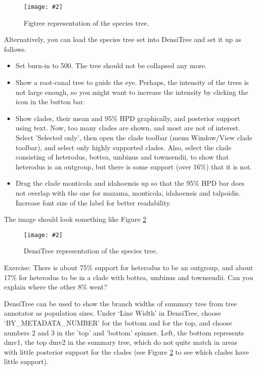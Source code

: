 \documentclass{article}
\newcommand{\includeimage}[2][]{%
\texttt{[image: \#2]}
}
\begin{document}
\begin{figure}
\centering
\includeimage[width=\textwidth]{figures/figtree}

\caption{\label{fig.figtree} Figtree representation of the species tree.}
\end{figure}


Alternatively, you can load the species tree set into DensiTree and set it up as follows.

\begin{itemize}
\item Set burn-in to 500. The tree should not be collapsed any more.
\item Show a root-canal tree to guide the eye. Perhaps, the intensity of the trees is not large enough, so you might want to increase the intensity by clicking the icon in the button bar.
\item Show clades, their mean and 95\% HPD graphically, and posterior support using text. Now, too many clades are shown, and most are not of interest. Select 'Selected only', then open the clade toolbar (menu Window/View clade toolbar), and select only highly supported clades. Also, select the clade consisting of heterodus, bottea, umbinus and townsendii, to show that heterodus is an outgroup,
but there is some support (over 16\%) that it is not.
\item Drag the clade monticola and idahoensis up so that the 95\% HPD bar does not overlap with the one for mazama, monticola, idahoensis and talpoidis. Increase font size of the label for better readability.
\end{itemize}

The image should look something like Figure \ref{fig.DensiTree}

\begin{figure}
\centering
\includeimage[scale=0.4]{figures/DensiTree}
\caption{\label{fig.DensiTree} DensiTree representation of the species tree.}
\end{figure}

Exercise: There is about 75\% support for heterodus to be an outgroup, and about 17\% for heterodus to be in a clade with bottea, umbinus and townsendii. Can you explain where the other 8\% went?


DensiTree can be used to show the branch widths of summary 
tree from tree annotator as population sizes. 
Under `Line Width' in DensiTree, choose `BY\_METADATA\_NUMBER' for the bottom and for the top,
and choose numbers 2 and 3 in the 'top' and 'bottom' spinner.
Left, the bottom represents dmv1, the top dmv2 in the summary tree, which do not quite match 
in areas with little posterior support for the clades (see Figure \ref{fig.DensiTree} to
see which clades have little support).
\end{document}
